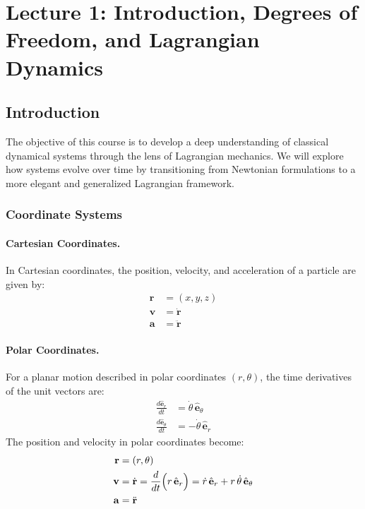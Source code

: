 \setcounter{section}{0}

\section{Lecture 1: Introduction, Degrees of Freedom, and Lagrangian Dynamics}

\subsection{Introduction}

The objective of this course is to develop a deep understanding of classical dynamical systems through the lens of Lagrangian mechanics. We will explore how systems evolve over time by transitioning from Newtonian formulations to a more elegant and generalized Lagrangian framework.

\subsubsection*{Coordinate Systems}

\paragraph{Cartesian Coordinates.}
In Cartesian coordinates, the position, velocity, and acceleration of a particle are given by:
\begin{equation}
    \begin{aligned}
        \mathbf{r} & = (x, y, z)         \\
        \mathbf{v} & = \dot{\mathbf{r}}  \\
        \mathbf{a} & = \ddot{\mathbf{r}}
    \end{aligned}
\end{equation}

\paragraph{Polar Coordinates.}
For a planar motion described in polar coordinates $(r,\theta)$, the time derivatives of the unit vectors are:
\begin{equation}
    \begin{aligned}
        \frac{d\hat{\mathbf{e}}_r}{dt}      & = \dot{\theta}\,\hat{\mathbf{e}}_\theta \\
        \frac{d\hat{\mathbf{e}}_\theta}{dt} & = -\dot{\theta}\,\hat{\mathbf{e}}_r
    \end{aligned}
\end{equation}
The position and velocity in polar coordinates become:
\begin{equation}
    \begin{aligned}
        \mathbf{r} & = (r, \theta) \\
        \mathbf{v} & = \dot{\mathbf{r}} = \frac{d}{dt}\Bigl(r\,\hat{\mathbf{e}}_r\Bigr)
        = \dot{r}\,\hat{\mathbf{e}}_r + r\,\dot{\theta}\,\hat{\mathbf{e}}_\theta \\
        \mathbf{a} & = \ddot{\mathbf{r}}
    \end{aligned}
\end{equation}

